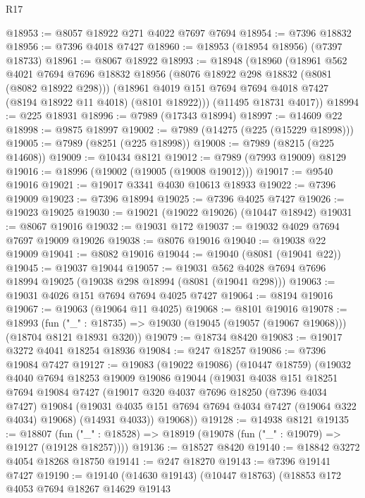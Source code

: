 \begin{lexlean}{R17}
\begin{coremodule}
@18953 := @8057 @18922 @271 @4022 @7697 @7694
@18954 := @7396 @18832
@18956 := @7396 @4018 @7427
@18960 := @18953 (@18954 @18956) (@7397 @18733)
@18961 := @8067 @18922
@18993 := @18948
    (@18960
      (@18961
        @562
        @4021
        @7694
        @7696
        @18832
        @18956
        (@8076 @18922 @298 @18832 (@8081 (@8082 @18922 @298)))
        (@18961 @4019 @151 @7694 @7694 @4018 @7427 (@8194 @18922 @11 @4018) (@8101 @18922)))
      (@11495 @18731 @4017))
@18994 := @225 @18931
@18996 := @7989 (@17343 @18994)
@18997 := @14609 @22
@18998 := @9875 @18997
@19002 := @7989 (@14275 (@225 (@15229 @18998)))
@19005 := @7989 (@8251 (@225 @18998))
@19008 := @7989 (@8215 (@225 @14608))
@19009 := @10434 @8121
@19012 := @7989 (@7993 @19009) @8129
@19016 := @18996 (@19002 (@19005 (@19008 @19012)))
@19017 := @9540 @19016
@19021 := @19017 @3341 @4030 @10613 @18933
@19022 := @7396 @19009
@19023 := @7396 @18994
@19025 := @7396 @4025 @7427
@19026 := @19023 @19025
@19030 := @19021 (@19022 @19026) (@10447 @18942)
@19031 := @8067 @19016
@19032 := @19031 @172
@19037 := @19032 @4029 @7694 @7697 @19009 @19026
@19038 := @8076 @19016
@19040 := @19038 @22 @19009
@19041 := @8082 @19016
@19044 := @19040 (@8081 (@19041 @22))
@19045 := @19037 @19044
@19057 := @19031 @562 @4028 @7694 @7696 @18994 @19025 (@19038 @298 @18994 (@8081 (@19041 @298)))
@19063 := @19031 @4026 @151 @7694 @7694 @4025 @7427
@19064 := @8194 @19016
@19067 := @19063 (@19064 @11 @4025)
@19068 := @8101 @19016
@19078 := @18993
    (fun ("_" : @18735) => @19030 (@19045 (@19057 (@19067 @19068))) (@18704 @8121 @18931 @320))
@19079 := @18734 @8420
@19083 := @19017 @3272 @4041 @18254 @18936
@19084 := @247 @18257
@19086 := @7396 @19084 @7427
@19127 := @19083
    (@19022 @19086)
    (@10447 @18759)
    (@19032
      @4040
      @7694
      @18253
      @19009
      @19086
      @19044
      (@19031
        @4038
        @151
        @18251
        @7694
        @19084
        @7427
        (@19017
          @320
          @4037
          @7696
          @18250
          (@7396 @4034 @7427)
          @19084
          (@19031 @4035 @151 @7694 @7694 @4034 @7427 (@19064 @322 @4034) @19068)
          (@14931 @4033))
        @19068))
@19128 := @14938 @8121
@19135 := @18807
    (fun ("_" : @18528) => @18919 (@19078 (fun ("_" : @19079) => @19127 (@19128 @18257))))
@19136 := @18527 @8420
@19140 := @18842 @3272 @4054 @18268 @18750
@19141 := @247 @18270
@19143 := @7396 @19141 @7427
@19190 := @19140
    (@14630 @19143)
    (@10447 @18763)
    (@18853
      @172
      @4053
      @7694
      @18267
      @14629
      @19143

\end{coremodule}
\end{lexlean}

